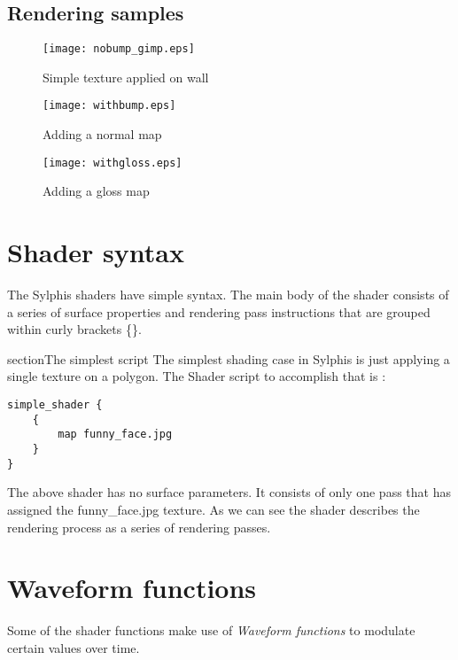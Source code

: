 \documentclass[12pt, titlepage]{amsart}
\begin{document}
\subsection{Rendering samples}
\begin{figure}
\begin{center}
\texttt{[image: nobump\_gimp.eps]} \\
\end{center}
\caption{Simple texture applied on wall}
\label{figure:nobump}
\end{figure}

\begin{figure}
\begin{center}
\texttt{[image: withbump.eps]} \\
\end{center}
\caption{Adding a normal map}
\label{figure:addnormalmap}
\end{figure}

\begin{figure}
\begin{center}
\texttt{[image: withgloss.eps]} \\
\end{center}
\caption{Adding a gloss map}
\label{figure:addglossmap}
\end{figure}

\section{Shader syntax}
The Sylphis shaders have simple syntax. The main body of the shader
consists of a series of surface properties and rendering pass instructions
that are grouped within curly brackets \{\}.

section{The simplest script}
The simplest shading case in Sylphis is just applying a single texture
on a polygon. The Shader script to accomplish that is :

\begin{verbatim}
simple_shader {
    {
        map funny_face.jpg
    }
}
\end{verbatim}

The above shader has no surface parameters. It consists of only one pass
that has assigned the funny\_face.jpg texture. As we can see the shader
describes the rendering process as a series of rendering passes.

\section{Waveform functions}
\label{waveforms}
Some of the shader functions make use of \textit{Waveform functions} to modulate
certain values over time.
\end{document}

